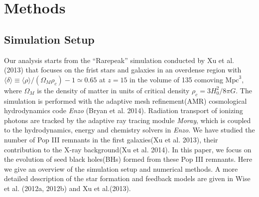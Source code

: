 \documentclass[useAMS,usenatbib]{mn2e}
\begin{document}
\section{Methods}

\subsection{Simulation Setup}
Our analysis starts from the ``Rarepeak'' simulation conducted by Xu et al.
(2013) that focuses on the frist stars and galaxies in an overdense region with 
$\langle\delta\rangle \equiv \langle\rho\rangle/(\Omega_M\rho_c)-1\simeq 0.65$
at $z=15$ in the volume of 135 comoving $\mbox{Mpc}^3$, where $\Omega_M$ is the density
of matter in units of critical density $\rho_c = 3H^2_0/8\pi G$. The simulation
is performed with the adaptive mesh refinement(AMR) cosmological hydrodynamics
code \textit{Enzo} (Bryan et al. 2014). Radiation transport of ionizing photons are
tracked by the adaptive ray tracing module \textit{Moray}, which is coupled to the
hydrodynamics, energy and chemistry solvers in \textit{Enzo}. We have studied the
number of Pop III remnants in the first galaxies(Xu et al. 2013), their
contribution to the X-ray background(Xu et al. 2014). In this paper, we focus on
the evolution of seed black holes(BHs) formed from these Pop III remnants. 
Here we give an overview of the simulation setup and numerical methods. A more 
detailed description of the star formation and feedback models are given in 
Wise et al. (2012a, 2012b) and Xu et al.(2013).\\
\end{document}
